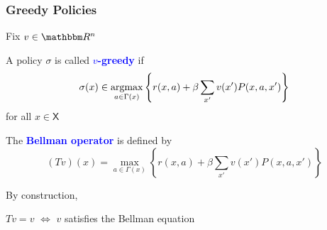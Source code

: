 \documentclass[xcolor=dvipsnames]{beamer}
\newcommand{\navy}[1]{\textcolor{Blue}{\bf #1}}
\newcommand{\RR}{\mathbbm R}
\newcommand{\Xsf}{\mathsf X}
\newcommand{\argmax}{\operatornamewithlimits{argmax}}
\newcommand{\1}{\mathbbm 1}
\begin{document}
\begin{frame}
    \frametitle{Greedy Policies}

    Fix $v \in \RR^n$ 
    
    \vspace{0.5em}
    \vspace{0.5em}
    \vspace{0.5em}
    A policy $\sigma$ is called
    \navy{$v$-greedy} if
    \begin{equation*}
        \sigma(x)
        \in \argmax_{a \in \Gamma(x)}
        \left\{
            r(x, a)
            + \beta
            \sum_{x'} v(x') P(x, a, x')
        \right\}
    \end{equation*}
    for all $x \in \Xsf$



\end{frame}


\begin{frame}
    
    \vspace{0.5em}
    The \navy{Bellman operator} is  defined by
    \begin{equation*}
        (Tv)(x)
            = \max_{a \in \Gamma(x)}
            \left\{
                r(x, a)
                + \beta
                \sum_{x' } v(x') P(x, a, x')
            \right\}
    \end{equation*}

    \vspace{0.5em}
    \vspace{0.5em}
    \vspace{0.5em}

    By construction, 

    \begin{center}
        $Tv=v$ $\iff$ $v$  satisfies the Bellman equation
    \end{center}

\end{frame}
\end{document}
